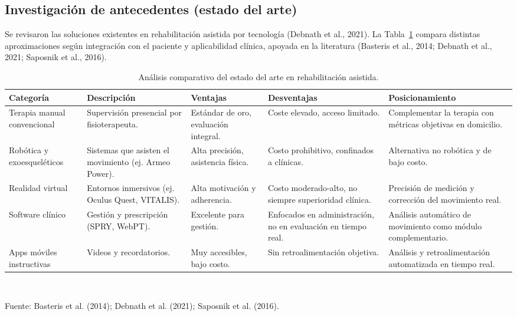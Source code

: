\documentclass[11pt,a4paper]{article}
\renewcommand{\arraystretch}{1.35}
\begin{document}
\subsection{Investigación de antecedentes (estado del arte)}
Se revisaron las soluciones existentes en rehabilitación asistida por tecnología (Debnath et al., 2021). La Tabla~\ref{tab:estadoarte} compara distintas aproximaciones según integración con el paciente y aplicabilidad clínica, apoyada en la literatura (Basteris et al., 2014; Debnath et al., 2021; Saposnik et al., 2016).

\begin{table}[htbp]
\caption{Análisis comparativo del estado del arte en rehabilitación asistida.}
\label{tab:estadoarte}
\small
\centering
\renewcommand{\arraystretch}{1.45}
\begin{tabular}{@{}p{2.4cm}p{2.5cm}p{2.2cm}p{2.5cm}p{2.9cm}@{}}
\toprule
Categoría & Descripción & Ventajas & Desventajas & Posicionamiento \\
\midrule
Terapia manual convencional & Supervisión presencial por fisioterapeuta. & Estándar de oro, evaluación integral. & Coste elevado, acceso limitado. & Complementar la terapia con métricas objetivas en domicilio. \\
\addlinespace
Robótica y exoesqueléticos & Sistemas que asisten el movimiento (ej. Armeo Power). & Alta precisión, asistencia física. & Costo prohibitivo, confinados a clínicas. & Alternativa no robótica y de bajo costo. \\
\addlinespace
Realidad virtual & Entornos inmersivos (ej. Oculus Quest, VITALIS). & Alta motivación y adherencia. & Costo moderado-alto, no siempre superioridad clínica. & Precisión de medición y corrección del movimiento real. \\
\addlinespace
Software clínico & Gestión y prescripción (SPRY, WebPT). & Excelente para gestión. & Enfocados en administración, no en evaluación en tiempo real. & Análisis automático de movimiento como módulo complementario. \\
\addlinespace
Apps móviles instructivas & Videos y recordatorios. & Muy accesibles, bajo costo. & Sin retroalimentación objetiva. & Análisis y retroalimentación automatizada en tiempo real. \\
\bottomrule
\end{tabular}\\
\renewcommand{\arraystretch}{1.35}
\vspace{4pt}
\raggedright\footnotesize Fuente: Basteris et al. (2014); Debnath et al. (2021); Saposnik et al. (2016).
\end{table}
\vspace{0.6em}
\end{document}
